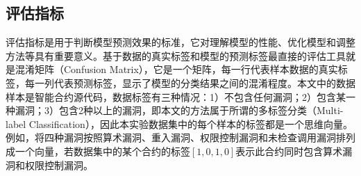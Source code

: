 \subsection{评估指标}
\label{sec:评估指标}
评估指标是用于判断模型预测效果的标准，它对理解模型的性能、优化模型和调整方法等具有重要意义。基于数据的真实标签和模型的预测标签最直接的评估工具就是混淆矩阵（Confusion Matrix），它是一个矩阵，每一行代表样本数据的真实标签，每一列代表预测标签，显示了模型的分类结果之间的混淆程度。本文中的数据样本是智能合约源代码，数据标签有三种情况：1）不包含任何漏洞；2）包含某一种漏洞；3）包含2种以上的漏洞，即本文的方法属于所谓的多标签分类（Multi-label Classification），因此本实验数据集中的每个样本的标签都是一个思维向量。例如，将四种漏洞按照算术漏洞、重入漏洞、权限控制漏洞和未检查调用漏洞排列成一个向量，若数据集中的某个合约的标签$[ 1, 0, 1, 0 ]$表示此合约同时包含算术漏洞和权限控制漏洞。

